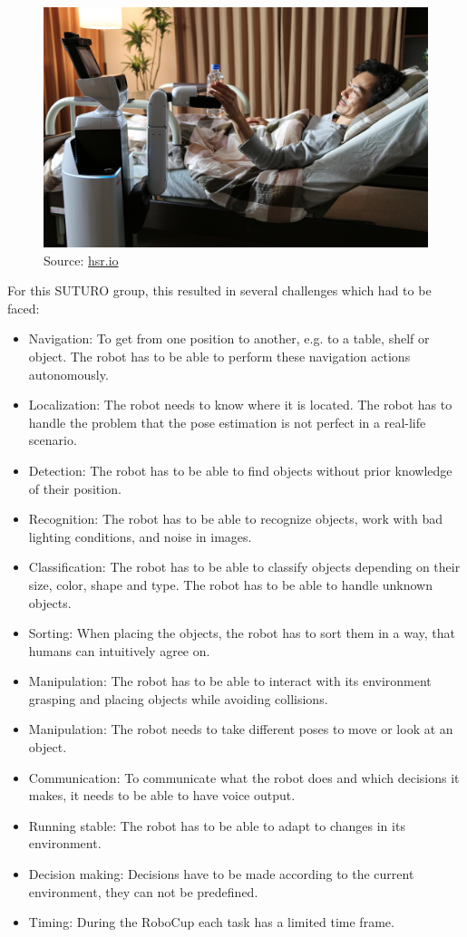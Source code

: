 \documentclass[main.tex]{subfiles}
\begin{document}
	\begin{figure}[H]
		\centering
		\includegraphics[scale=0.375]{pictures/front_page_hsr}
		\caption{Source: \href{www.hsr.io}{hsr.io}}
	\end{figure}
	
	For this SUTURO group, this resulted in several challenges which had to be faced:
	\begin{itemize}
		\item Navigation: To get from one position to another, e.g. to a table, shelf or object. The robot has to be able to perform these navigation actions autonomously.
		\item Localization: The robot needs to know where it is located. The robot has to handle the problem that the pose estimation is not perfect in a real-life scenario.
		\item Detection: The robot has to be able to find objects without prior knowledge of their position.
		\item Recognition: The robot has to be able to recognize objects, work with bad lighting conditions, and noise in images.
		\item Classification: The robot has to be able to classify objects depending on their size, color, shape and type. The robot has to be able to handle unknown objects.
		\item Sorting: When placing the objects, the robot has to sort them in a way, that humans can intuitively agree on.
		\item Manipulation: The robot has to be able to interact with its environment grasping and placing objects while avoiding collisions.
		\item Manipulation: The robot needs to take different poses to move or look at an object.
		\item Communication: To communicate what the robot does and which decisions it makes, it needs to be able to have voice output.
		\item Running stable: The robot has to be able to adapt to changes in its environment.
		\item Decision making: Decisions have to be made according to the current environment, they can not be predefined. 
		\item Timing: During the RoboCup each task has a limited time frame.
	\end{itemize}
\end{document}
